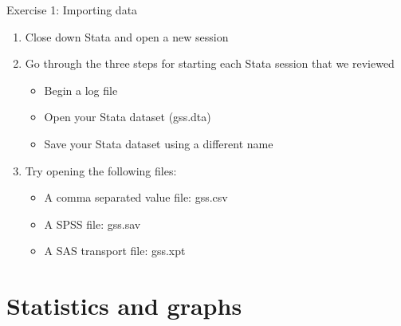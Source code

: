 \documentclass[table,smaller]{beamer}
\begin{document}
\begin{frame}[label=sec-2-6]{Exercise 1: Importing data}
\begin{enumerate}
\item Close down Stata and open a new session
\item Go through the three steps for starting each Stata  session that we reviewed
\begin{itemize}
\item Begin a log file
\item Open your Stata dataset (gss.dta)
\item Save your Stata dataset using a different name
\end{itemize}
\item Try opening the following files:
\begin{itemize}
\item A comma separated value file: gss.csv
\item A SPSS file: gss.sav
\item A SAS transport file: gss.xpt
\end{itemize}
\end{enumerate}
\end{frame}

\section{Statistics and graphs}
\label{sec-3}
\end{document}
